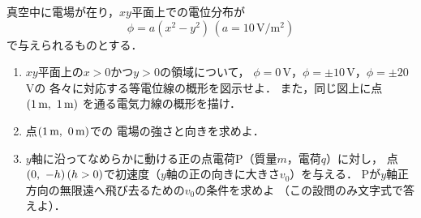 \documentclass[../../../physics-standard_questions_all.tex]{subfiles}
\begin{document}
\setlength{\abovedisplayskip}{0mm}
\setlength{\belowdisplayskip}{0mm}

真空中に電場が在り，$xy$平面上での電位分布が
\[ \phi=a(x^2-y^2)\,(a=10\,\text{V/}\text{m}^2) \]
で与えられるものとする．

\begin{enumerate}
    
    \item $xy$平面上の$x>0$かつ$y>0$の領域について，
    $\phi=0$\,V，$\phi=\pm10$\,V，$\phi=\pm20$\,Vの
    各々に対応する等電位線の概形を図示せよ．
    また，同じ図上に点$(1\,\text{m}, \hspace{1.2mm}1\,\text{m})$
    を通る電気力線の概形を描け．

    \item 点$(1\,\text{m}, \hspace{1.2mm}0\,\text{m})$での
    電場の強さと向きを求めよ．

    \item $y$軸に沿ってなめらかに動ける正の点電荷P（質量$m$，電荷$q$）に対し，
    点$(0, \hspace{1.2mm}-h)\,(h>0)$で初速度（$y$軸の正の向きに大きさ$v_0$）を与える．
    Pが$y$軸正方向の無限遠へ飛び去るための$v_0$の条件を求めよ
    （この設問のみ文字式で答えよ）．

\end{enumerate}
\end{document}
